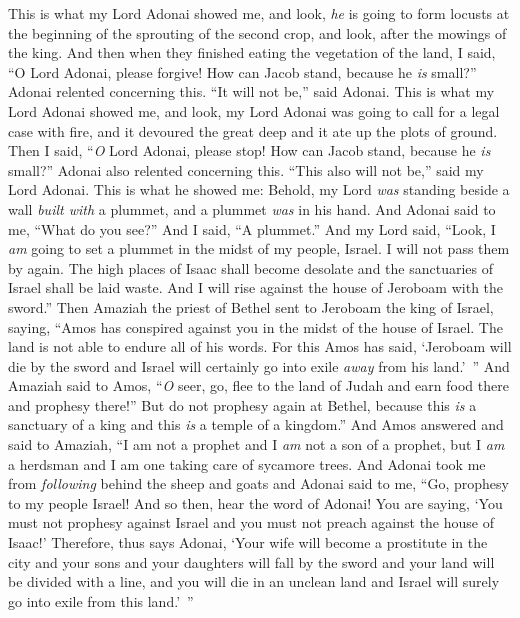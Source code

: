 \begin{biblechapter} %
 This is what my Lord Adonai showed me, and look, \textit{he} is going to form locusts at the beginning of the sprouting of the second crop, and look, after the mowings of the king.
\verse And then when they finished eating the vegetation of the land, I said, “O Lord Adonai, please forgive! How can Jacob stand, because he \textit{is} small?”
\verse Adonai relented concerning this. “It will not be,” said Adonai.
\verse This is what my Lord Adonai showed me, and look, my Lord Adonai was going to call for a legal case with fire, and it devoured the great deep and it ate up the plots of ground.
\verse Then I said, “\textit{O} Lord Adonai, please stop! How can Jacob stand, because he \textit{is} small?”
\verse Adonai also relented concerning this. “This also will not be,” said my Lord Adonai.
\verse This is what he showed me: Behold, my Lord \textit{was} standing beside a wall \textit{built with} a plummet, and a plummet \textit{was} in his hand.
\verse And Adonai said to me, “What do you see?” And I said, “A plummet.” And my Lord said, “Look, I \textit{am} going to set a plummet in the midst of my people, Israel. I will not pass them by again.
\verse The high places of Isaac shall become desolate and the sanctuaries of Israel shall be laid waste. And I will rise against the house of Jeroboam with the sword.”
 Then Amaziah the priest of Bethel sent to Jeroboam the king of Israel, saying, “Amos has conspired against you in the midst of the house of Israel. The land is not able to endure all of his words.
\verse For this Amos has said, ‘Jeroboam will die by the sword and Israel will certainly go into exile \textit{away} from his land.’ ”
\verse And Amaziah said to Amos, “\textit{O} seer, go, flee to the land of Judah and earn food there and prophesy there!”
\verse But do not prophesy again at Bethel, because this \textit{is} a sanctuary of a king and this \textit{is} a temple of a kingdom.”
\verse And Amos answered and said to Amaziah, “I am not a prophet and I \textit{am} not a son of a prophet, but I \textit{am} a herdsman and I am one taking care of sycamore trees.
\verse And Adonai took me from \textit{following} behind the sheep and goats and Adonai said to me, “Go, prophesy to my people Israel!
\verse And so then, hear the word of Adonai! You are saying, ‘You must not prophesy against Israel and you must not preach against the house of Isaac!’
\verse Therefore, thus says Adonai, ‘Your wife will become a prostitute in the city and your sons and your daughters will fall by the sword and your land will be divided with a line, and you will die in an unclean land and Israel will surely go into exile from this land.’ ”
\end{biblechapter}

